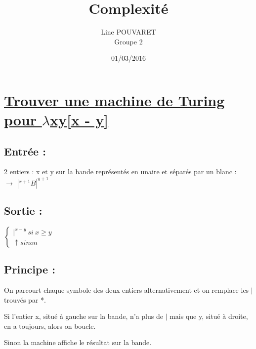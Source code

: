 \documentclass{article}
\title{Complexité}
\author{Line POUVARET\\Groupe 2}
\date{01/03/2016}
\begin{document}
\maketitle

\section*{\underline{Trouver une machine de Turing pour $\lambda$xy[x - y]}}

\subsection*{\textbf{Entrée :}}
2 entiers : x et y sur la bande représentés en unaire et séparés par un blanc : \\

$\rightarrow$ $|^{x+1}B|^{y+1}$

\subsection*{Sortie :}
$\left\{
	\begin{array}{ll}
		|^{x-y} ~ si ~ x \geq y \\
		\uparrow sinon
	\end{array}
\right.$

\subsection*{Principe :}

On parcourt chaque symbole des deux entiers alternativement et on remplace les $|$ trouvés par *.

Si l'entier x, situé à gauche sur la bande, n'a plus de $|$ mais que y, situé à droite, en a toujours, alors on boucle.

Sinon la machine affiche le résultat sur la bande.
\end{document}
